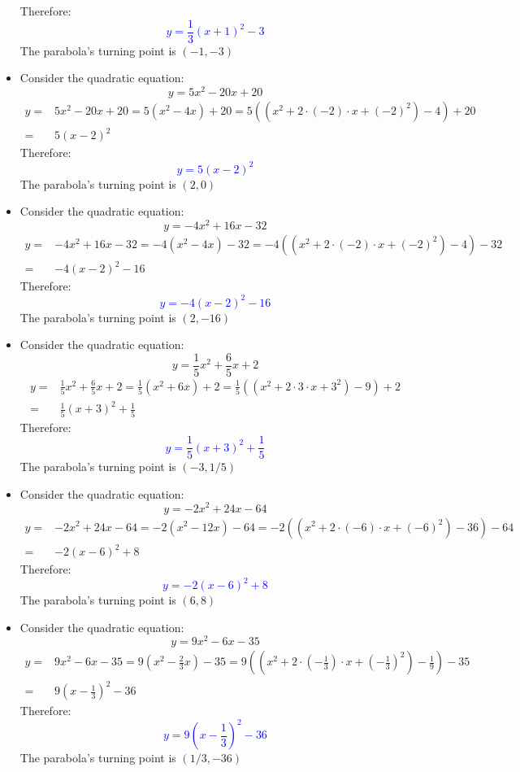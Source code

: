 \documentclass{article}
\newcommand{\dg}[1]{\textcolor{dark_green}{#1}}
\newcommand{\blue}[1]{\textcolor{blue}{#1}}
\begin{document}
\begin{itemize}
Therefore:
\blue{\[y = \frac{1}{3}(x + 1)^2 - 3\]}
The parabola's turning point is \((-1, -3)\)
\item Consider the quadratic equation:
\dg{\[y = 5x^2 - 20x + 20\]}
\begin{align*}
y = & 5x^2 - 20x + 20 
= 5(x^2 - 4x) + 20 
= 5((x^2 + 2 \cdot (-2) \cdot x + (-2)^2) - 4) + 20 \\
= & 5(x - 2)^2
\end{align*}
Therefore:
\blue{\[y = 5(x - 2)^2\]}
The parabola's turning point is \((2, 0)\)
\item Consider the quadratic equation:
\dg{\[y = -4x^2 + 16x - 32\]}
\begin{align*}
y = & -4x^2 + 16x - 32  
= -4(x^2 - 4x) - 32 
= -4((x^2 + 2 \cdot (-2) \cdot x + (-2)^2) - 4) - 32 \\ 
= & -4(x - 2)^2 - 16
\end{align*}
Therefore:
\blue{\[y = -4(x - 2)^2 - 16\]}
The parabola's turning point is \((2, -16)\) 
\item Consider the quadratic equation:
\dg{\[y = \frac{1}{5}x^2 + \frac{6}{5}x + 2\]}
\begin{align*}
y = & \frac{1}{5}x^2 + \frac{6}{5}x + 2 
= \frac{1}{5}(x^2 + 6x) + 2 
= \frac{1}{5}((x^2 + 2 \cdot 3 \cdot x + 3^2) - 9) + 2 \\
= & \frac{1}{5}(x + 3)^2 + \frac{1}{5}
\end{align*}
Therefore:
\blue{\[y = \frac{1}{5}(x + 3)^2 + \frac{1}{5}\]}
The parabola's turning point is \((-3, 1/5)\)
\item Consider the quadratic equation:
\dg{\[y = -2x^2 + 24x - 64\]}
\begin{align*}
y = & -2x^2 + 24x - 64 
= -2(x^2 - 12x) - 64 
= -2((x^2 + 2 \cdot (-6) \cdot x + (-6)^2) - 36) - 64 \\
= & -2(x - 6)^2 + 8
\end{align*}
Therefore:
\blue{\[y = -2(x - 6)^2 + 8\]}
The parabola's turning point is \((6, 8)\)
\item Consider the quadratic equation:
\dg{\[y = 9x^2 - 6x - 35\]}
\begin{align*}
y = & 9x^2 - 6x - 35   
= 9(x^2 - \frac{2}{3}x) - 35 
= 9((x^2 + 2 \cdot (-\frac{1}{3}) \cdot x + (-\frac{1}{3})^2) - \frac{1}{9}) - 35 \\
= & 9(x - \frac{1}{3})^2 - 36
\end{align*}
Therefore:
\blue{\[y = 9(x - \frac{1}{3})^2 - 36\]}
The parabola's turning point is \((1/3, -36)\)

\end{itemize}
\end{document}
